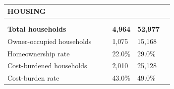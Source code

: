 \documentclass[9pt]{report}
\begin{document}
\vspace{12pt}
\setlength{\tabcolsep}{.01in} %
\begin{tabular}{p{.10in}p{.10in}p{.10in}p{3.7in}>{\hfill}p{.85in}>{\hfill}p{.85in}>{\hfill}p{.85in}>{\hfill}p{.85in}p{0.1in}}
\multicolumn{9}{l}{\parbox{7.1in}{\raggedright{\large{\strut\textbf{HOUSING}\strut}}}} \\ 
\hline
\multicolumn{4}{l}{\parbox{3.5in}{\raggedright{\textbf{}}}} & \multicolumn{1}{r}{\parbox{.85in}{\strut\raggedleft{\textbf{}\strut}}} & \multicolumn{1}{r}{\parbox{.85in}{\strut\raggedleft{\textbf{}\strut}}} & \multicolumn{1}{r}{\parbox{.85in}{\strut{}}} & \multicolumn{1}{r}{\parbox{.85in}{\strut{}}} & \\ 
\multicolumn{9}{l}{} \\ 
\multicolumn{4}{l}{\parbox{3.5in}{\strut\raggedright{\textbf{Total households}\strut}}} & \textbf{} & \textbf{} & \textbf{4,964} & \textbf{52,977} & \textbf{} \\ 
\multicolumn{4}{l}{\parbox{3.6in}{\strut\raggedright{{Owner-occupied households}}\strut}} &  &  & 1,075 & 15,168 & \multicolumn{1}{l}{}  \\ 
\multicolumn{4}{l}{\parbox{3.6in}{\strut\raggedright{{Homeownership rate}}\strut}} &  &  & 22.0\% & 29.0\% & \multicolumn{1}{l}{}  \\ 
\multicolumn{4}{l}{\parbox{3.6in}{\strut\raggedright{{Cost-burdened households}}\strut}} &  &  & 2,010 & 25,128 & \multicolumn{1}{l}{}  \\ 
\multicolumn{4}{l}{\parbox{3.6in}{\strut\raggedright{{Cost-burden rate}}\strut}} &  &  & 43.0\% & 49.0\% & \multicolumn{1}{l}{}  \\ 

\end{tabular}
\setlength{\tabcolsep}{6pt} %
\end{document}
